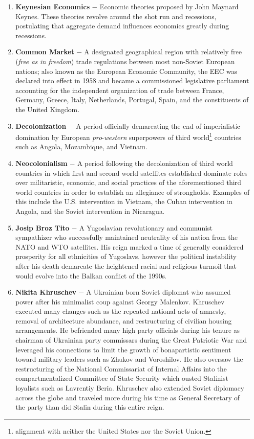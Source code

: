 \documentclass[12pt]{article}
\begin{document}
\begin{flushleft}
\begin{enumerate}
	\item \textbf{Keynesian Economics} $-$ Economic theories proposed by John Maynard Keynes. These theories revolve around the shot run and recessions, postulating that aggregate demand influences economics greatly during recessions.

    \item \textbf{Common Market} $-$ A designated geographical region with relatively free (\emph{free as in freedom}) trade regulations between most non-Soviet European nations; also known as the European Economic Community, the EEC was declared into effect in 1958 and became a commissioned legislative parliament accounting for the independent organization of trade between France, Germany, Greece, Italy, Netherlands, Portugal, Spain, and the constituents of the United Kingdom. 

    \item \textbf{Decolonization} $-$ A period officially demarcating the end of imperialistic domination by European \emph{pro}-\emph{western} superpowers of third world\footnote{alignment with neither the United States nor the Soviet Union.} countries such as Angola, Mozambique, and Vietnam.
      
    \item \textbf{Neocolonialism} $-$ A period following the decolonization of third world countries in which first and second world satellites established dominate roles over militaristic, economic, and social practices of the aforementioned third world countries in order to establish an allegiance of strongholds. Examples of this include the U.S. intervention in Vietnam, the Cuban intervention in Angola, and the Soviet intervention in Nicaragua.

    \item \textbf{Josip Broz Tito} $-$ A Yugoslavian revolutionary and communist sympathizer who successfully maintained neutrality of his nation from the NATO and WTO satellites. His reign marked a time of generally considered prosperity for all ethnicities of Yugoslavs, however the political instability after his death demarcate the heightened racial and religious turmoil that would evolve into the Balkan conflict of the 1990s.

    \item \textbf{Nikita Khruschev} $-$ A Ukrainian born Soviet diplomat who assumed power after his minimalist coup against Georgy Malenkov. Khruschev executed many changes such as the repeated national acts of amnesty, removal of architecture abundance, and restructuring of civilian housing arrangements. He befriended many high party officials during his tenure as chairman of Ukrainian party commissars during the Great Patriotic War and leveraged his connections to limit the growth of bonapartistic sentiment toward military leaders such as Zhukov and Voroshilov. He also oversaw the restructuring of the National Commissariat of Internal Affairs into the compartmentalized Committee of State Security which ousted Stalinist loyalists such as Lavrentiy Beria. Khruschev also extended Soviet diplomacy across the globe and traveled more during his time as General Secretary of the party than did Stalin during this entire reign. 


\end{enumerate}
\end{flushleft}
\end{document}

